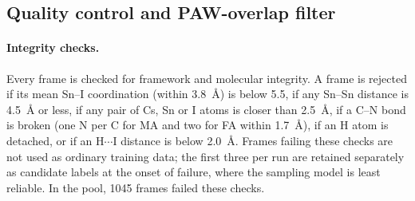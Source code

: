 \begin{table}[tb]
\caption{Sampling stages. Ensembles, run lengths and frame counts after quality control and the
PAW-overlap cut. S6 also contributes 215 frames of the reference compounds Cs$_2$SnI$_6$, SnI$_2$ and
CsI, included in the total.}
\label{tab:si-stages}
\end{table}

\subsection{Quality control and PAW-overlap filter}
\label{sec:configgen:qc}

\paragraph{Integrity checks.} Every frame is checked for framework and molecular integrity. A frame is
rejected if its mean Sn--I coordination (within \SI{3.8}{\angstrom}) is below 5.5, if any Sn--Sn
distance is \SI{4.5}{\angstrom} or less, if any pair of Cs, Sn or I atoms is closer than
\SI{2.5}{\angstrom}, if a C--N bond is broken (one N per C for MA and two for FA within
\SI{1.7}{\angstrom}), if an H atom is detached, or if an H$\cdots$I distance is below
\SI{2.0}{\angstrom}. Frames failing these checks are not used as ordinary training data; the first
three per run are retained separately as candidate labels at the onset of failure, where the sampling
model is least reliable. In the pool, 1045 frames failed these checks.

